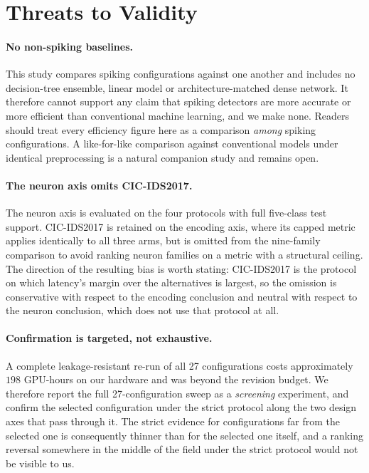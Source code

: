 %

\section{Threats to Validity}
\label{sec:threats}

\paragraph{No non-spiking baselines.}
This study compares spiking configurations against one another and includes no
decision-tree ensemble, linear model or architecture-matched dense network. It
therefore cannot support any claim that spiking detectors are more accurate or
more efficient than conventional machine learning, and we make none. Readers
should treat every efficiency figure here as a comparison \emph{among} spiking
configurations. A like-for-like comparison against conventional models under
identical preprocessing is a natural companion study and remains open.

\paragraph{The neuron axis omits CIC-IDS2017.}
The neuron axis is evaluated on the four protocols with full five-class test
support. CIC-IDS2017 is retained on the encoding axis, where its capped metric
applies identically to all three arms, but is omitted from the nine-family
comparison to avoid ranking neuron families on a metric with a structural
ceiling. The direction of the resulting bias is worth stating: CIC-IDS2017 is
the protocol on which latency's margin over the alternatives is largest, so the
omission is conservative with respect to the encoding conclusion and neutral
with respect to the neuron conclusion, which does not use that protocol at all.

\paragraph{Confirmation is targeted, not exhaustive.}
A complete leakage-resistant re-run of all 27 configurations costs approximately
$198$ GPU-hours on our hardware and was beyond the revision budget. We therefore
report the full 27-configuration sweep as a \emph{screening} experiment, and confirm the selected configuration under the strict
protocol along the two design axes that pass through it. The strict evidence for
configurations far from the selected one is consequently thinner than for the
selected one itself, and a ranking reversal somewhere in the middle of the field
under the strict protocol would not be visible to us.


